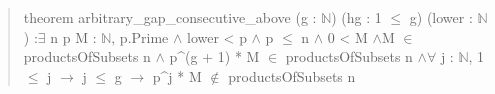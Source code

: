 \documentclass[11pt,a4paper]{article}
\begin{document}
\begin{quote}\small\ttfamily theorem arbitrary\_gap\_consecutive\_above (g : \ensuremath{\mathbb{N}}) (hg : 1 \ensuremath{\leq} g) (lower : \ensuremath{\mathbb{N}}) :\newline \ensuremath{\exists} n p M : \ensuremath{\mathbb{N}}, p.Prime \ensuremath{\wedge} lower < p \ensuremath{\wedge} p \ensuremath{\leq} n \ensuremath{\wedge} 0 < M \ensuremath{\wedge}\newline M \ensuremath{\in} productsOfSubsets n \ensuremath{\wedge} p\textasciicircum{}(g + 1) * M \ensuremath{\in} productsOfSubsets n \ensuremath{\wedge}\newline \ensuremath{\forall} j : \ensuremath{\mathbb{N}}, 1 \ensuremath{\leq} j \ensuremath{\to} j \ensuremath{\leq} g \ensuremath{\to} p\textasciicircum{}j * M \ensuremath{\notin} productsOfSubsets n\end{quote}
\end{document}
